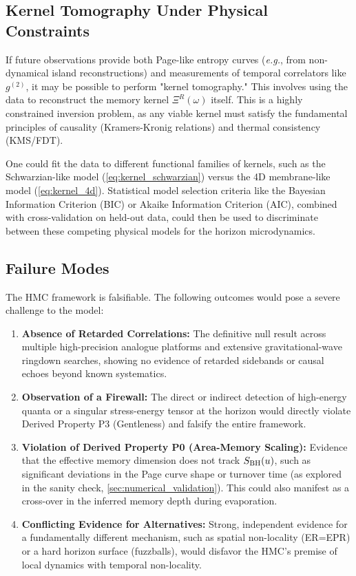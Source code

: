 \documentclass[aps,prd,preprint,onecolumn,superscriptaddress,nofootinbib,longbibliography,floatfix,11pt,showpacs,showkeys]{revtex4-2}
\newcommand{\eg}{\textit{e.g.}\xspace}
\newcommand{\HMC}{\textsc{HMC}\xspace}
\theoremstyle{plain}
\theoremstyle{definition}
\theoremstyle{remark}
\begin{document}
\subsection{Kernel Tomography Under Physical Constraints}
If future observations provide both Page-like entropy curves (\eg, from non-dynamical island reconstructions) and measurements of temporal correlators like $g^{(2)}$, it may be possible to perform "kernel tomography." This involves using the data to reconstruct the memory kernel $\Xi^R(\omega)$ itself. This is a highly constrained inversion problem, as any viable kernel must satisfy the fundamental principles of causality (Kramers-Kronig relations) and thermal consistency (KMS/FDT).

One could fit the data to different functional families of kernels, such as the Schwarzian-like model (\eqref{eq:kernel_schwarzian}) versus the 4D membrane-like model (\eqref{eq:kernel_4d}). Statistical model selection criteria like the Bayesian Information Criterion (BIC) or Akaike Information Criterion (AIC), combined with cross-validation on held-out data, could then be used to discriminate between these competing physical models for the horizon microdynamics.

\subsection{Failure Modes}
The \HMC{} framework is falsifiable. The following outcomes would pose a severe challenge to the model:
\begin{enumerate}
    \item \textbf{Absence of Retarded Correlations:} The definitive null result across multiple high-precision analogue platforms and extensive gravitational-wave ringdown searches, showing no evidence of retarded sidebands or causal echoes beyond known systematics.
    \item \textbf{Observation of a Firewall:} The direct or indirect detection of high-energy quanta or a singular stress-energy tensor at the horizon would directly violate Derived Property P3 (Gentleness) and falsify the entire framework.
    \item \textbf{Violation of Derived Property P0 (Area-Memory Scaling):} Evidence that the effective memory dimension does not track $S_{\rm BH}(u)$, such as significant deviations in the Page curve shape or turnover time (as explored in the sanity check, \cref{sec:numerical_validation}). This could also manifest as a cross-over in the inferred memory depth during evaporation.
    \item \textbf{Conflicting Evidence for Alternatives:} Strong, independent evidence for a fundamentally different mechanism, such as spatial non-locality (ER=EPR) or a hard horizon surface (fuzzballs), would disfavor the \HMC{}'s premise of local dynamics with temporal non-locality.
\end{enumerate}
\end{document}
